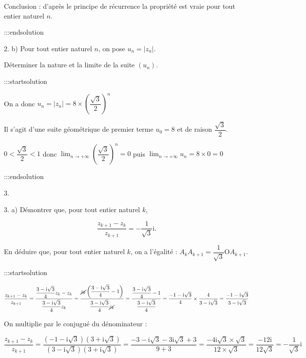 \documentclass{cornouaille}
\begin{document}
Conclusion : d'après le principe de récurrence la propriété est vraie pour tout entier naturel $n$.


:::endsolution


2. b)  Pour tout entier naturel $n$, on pose $u_n = \left|z_n\right|$.

Déterminer la nature et la limite de la suite $\left(u_n\right)$.


:::startsolution

On a donc $u_n=\left|z_n\right| =8 \times \left( \dfrac{\sqrt{3}}{2} \right)^n$\smallskip

Il s'agit d'une suite géométrique de premier terme $u_0=8$ et de raison $\dfrac{\sqrt{3}}{2}$. \medskip

$0 < \dfrac{\sqrt{3}}{2} < 1$ donc $\displaystyle\lim_{n \to + \infty} \left( \dfrac{\sqrt{3}}{2} \right)^n = 0$ puis $\boxed{ \displaystyle\lim_{n \to + \infty} u_n = 8 \times 0 = 0 }$


:::endsolution




3. 




3. a)  Démontrer que, pour tout entier naturel $k$,


$$
\dfrac{z_{k+1} - z_{k}}{z_{k+1}} = - \dfrac{1}{\sqrt{3}}\text{i}.
$$


En déduire que, pour tout entier naturel $k$, on a l'égalité : $A_kA_{k+1} = \dfrac{1}{\sqrt{3}} \text{O}A_{k+1}$.


:::startsolution

$\dfrac{z_{k+1} - z_k}{z_{k+1} } = \dfrac{ \dfrac{3-\text{i}\sqrt{3}}{4}z_k - z_k}{ \dfrac{3-\text{i}\sqrt{3}}{4}z_k } = \dfrac{ \cancel{z_k} \left( \dfrac{3-\text{i}\sqrt{3}}{4} - 1 \right)}{ \dfrac{3-\text{i}\sqrt{3}}{4}\cancel{z_k} }
=\dfrac{ \dfrac{3-\text{i}\sqrt{3}}{4} - 1 }{\dfrac{3-\text{i}\sqrt{3}}{4}}
= \dfrac{ -1-\text{i}\sqrt{3} }{4} \times \dfrac{4}{3-\text{i}\sqrt{3}}
= \dfrac{ -1-\text{i}\sqrt{3} }{3-\text{i}\sqrt{3}}$\medskip

On multiplie par le conjugué du dénominateur :\smallskip

$\dfrac{z_{k+1} - z_k}{z_{k+1}}
=\dfrac{ (-1-\text{i}\sqrt{3})(3+\text{i}\sqrt{3}) }{ (3-\text{i}\sqrt{3})(3+\text{i}\sqrt{3})}
= \dfrac{-3-\text{i}\sqrt{3}-3\text{i}\sqrt{3}+3 }{9+3} = \dfrac{-4\text{i}\sqrt{3}\times \sqrt{3} }{12 \times \sqrt{3} } = \dfrac{-12\text{i}}{12\sqrt{3}} = - \dfrac{1}{\sqrt{3}} \text{i}$\medskip
\end{document}
